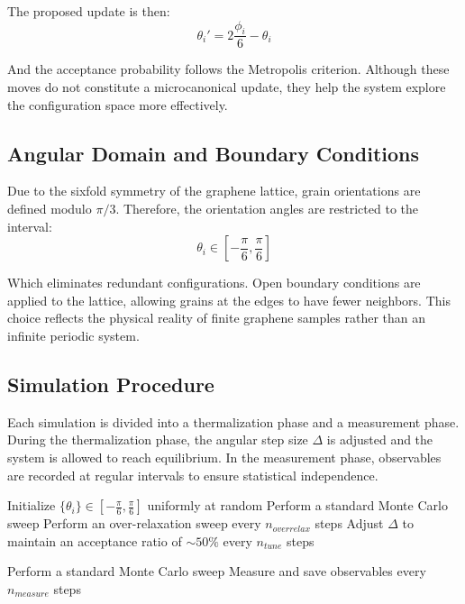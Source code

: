 The proposed update is then:
\begin{equation}
    \theta_i' = 2 \frac{\phi_i}{6} - \theta_i
\end{equation}

And the acceptance probability follows the Metropolis criterion. Although these moves do not constitute a microcanonical update, they help the system explore the configuration space more effectively.

\subsection{Angular Domain and Boundary Conditions}

Due to the sixfold symmetry of the graphene lattice, grain orientations are defined modulo $\pi/3$. Therefore, the orientation angles are restricted to the interval:
\begin{equation}
    \theta_i \in \left[-\frac{\pi}{6}, \frac{\pi}{6}\right]
\end{equation}

Which eliminates redundant configurations. Open boundary conditions are applied to the lattice, allowing grains at the edges to have fewer neighbors. This choice reflects the physical reality of finite graphene samples rather than an infinite periodic system.

\subsection{Simulation Procedure}

Each simulation is divided into a thermalization phase and a measurement phase. During the thermalization phase, the angular step size $\Delta$ is adjusted and the system is allowed to reach equilibrium. In the measurement phase, observables are recorded at regular intervals to ensure statistical independence.

\begin{algorithm}[H]
\caption{Monte Carlo Simulation Procedure}
\begin{algorithmic}[1]
\STATE Initialize $\{\theta_i\} \in \left[-\frac{\pi}{6}, \frac{\pi}{6}\right]$ uniformly at random
    \STATE Perform a standard Monte Carlo sweep
    \STATE Perform an over-relaxation sweep every $n_{overrelax}$ steps
    \STATE Adjust $\Delta$ to maintain an acceptance ratio of $\sim 50\%$ every $n_{tune}$ steps
\ENDFOR

    \STATE Perform a standard Monte Carlo sweep
    \STATE Measure and save observables every $n_{measure}$ steps
\ENDFOR
\end{algorithmic}
\end{algorithm}

